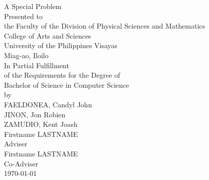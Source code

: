 \begin{titlepage}
\centering


\vspace{0.875cm}
A Special Problem\\
Presented to\\
the Faculty of the Division of Physical Sciences and Mathematics\\
College of Arts and Sciences\\
University of the Philippines Visayas\\
Miag-ao, Iloilo\\
\vspace{0.875cm}
In Partial Fulfillment\\
of the Requirements for the Degree of\\
Bachelor of Science in Computer Science\\
\vspace{1.1cm} %
by\\
\vspace{0.1cm}
FAELDONEA, Candyl John  \\
JINON, Jon Robien  \\
ZAMUDIO, Kent Joash  \\
\vspace{0.875cm}
Firstname LASTNAME \\
Adviser\\
Firstname LASTNAME \\
Co-Adviser\\
\vspace{0.875cm}
\today
\end{titlepage}
